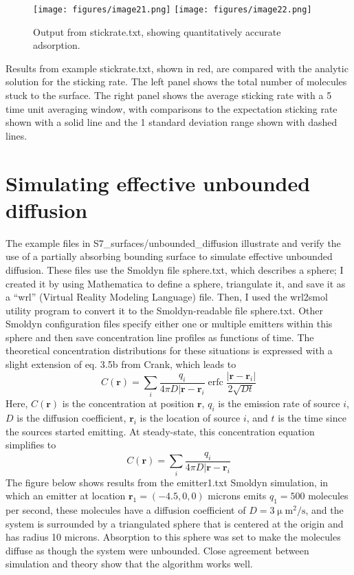 \documentclass {scrbook}
\DeclareMathOperator{\erfc}{erfc}
\begin{document}
\begin{figure}[h]
\centering
\texttt{[image: figures/image21.png]}
\texttt{[image: figures/image22.png]}
\caption{Output from stickrate.txt, showing quantitatively accurate adsorption.}
\label{fig:stickrate}
\end{figure}

Results from example stickrate.txt, shown in red, are compared with the analytic solution for the sticking rate. The left panel shows the total number of molecules stuck to the surface. The right panel shows the average sticking rate with a 5 time unit averaging window, with comparisons to the expectation sticking rate shown with a solid line and the 1 standard deviation range shown with dashed lines.

\section{Simulating effective unbounded diffusion}

The example files in S7\_surfaces/unbounded\_diffusion illustrate and verify the use of a partially absorbing bounding surface to simulate effective unbounded diffusion. These files use the Smoldyn file sphere.txt, which describes a sphere; I created it by using Mathematica to define a sphere, triangulate it, and save it as a ``wrl'' (Virtual Reality Modeling Language) file. Then, I used the wrl2smol utility program to convert it to the Smoldyn-readable file sphere.txt. Other Smoldyn configuration files specify either one or multiple emitters within this sphere and then save concentration line profiles as functions of time. The theoretical concentration distributions for these situations is expressed with a slight extension of eq. 3.5b from Crank, which leads to
$$C(\mathbf{r}) = \sum_i \frac{q_i}{4 \pi D |\mathbf{r} - \mathbf{r}_i} \erfc \frac{|\mathbf{r}-\mathbf{r}_i |}{2 \sqrt{Dt}}$$
Here, $C(\mathbf{r})$ is the concentration at position $\mathbf{r}$, $q_i$ is the emission rate of source $i$, $D$ is the diffusion coefficient, $\mathbf{r}_i$ is the location of source $i$, and $t$ is the time since the sources started emitting. At steady-state, this concentration equation simplifies to
$$C(\mathbf{r}) = \sum_i \frac{q_i}{4 \pi D |\mathbf{r} - \mathbf{r}_i} $$
The figure below shows results from the emitter1.txt Smoldyn simulation, in which an emitter at location $\mathbf{r}_1 = (-4.5,0,0)$ microns emits $q_1 = 500$ molecules per second, these molecules have a diffusion coefficient of $D = 3 \upmu \textrm{m}^2/\textrm{s}$, and the system is surrounded by a triangulated sphere that is centered at the origin and has radius 10 microns. Absorption to this sphere was set to make the molecules diffuse as though the system were unbounded. Close agreement between simulation and theory show that the algorithm works well.
\end{document}
